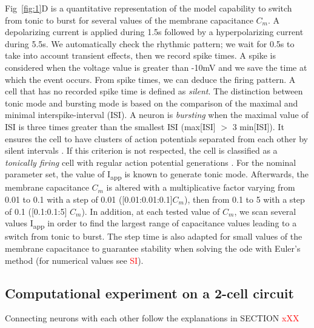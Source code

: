 Fig~\ref{fig:1}D is a quantitative representation of the model capability to switch from tonic to burst for several values of the membrane capacitance $C_m$.  A depolarizing current is applied during 1.5s followed by a hyperpolarizing current during 5.5s. We automatically check the rhythmic pattern; we wait for 0.5s to take into account transient effects, then we record spike times. A spike is considered when the voltage value is greater than -10mV and we save the time at which the event occurs.  From spike times, we can deduce the firing pattern. A cell that has no recorded spike time is defined as \textit{silent}. The distinction between tonic mode and bursting mode is based on the comparison of the maximal and minimal interspike-interval (ISI). A neuron is \textit{bursting} when the maximal value of ISI is three times greater than the smallest ISI (max[ISI] $>$ 3 min[ISI]). It ensures the cell to have clusters of action potentials separated from each other by  silent intervals . If this criterion is not respected, the cell is classified as a \textit{tonically firing }cell with regular action potential generations \citep{drion_switchable_2018, goldman_dependence_2000}. For the nominal parameter set, the value of I\textsubscript{app} is known to generate tonic mode. Afterwards, the membrane capacitance $C_m$ is altered with a multiplicative factor varying from 0.01 to 0.1 with a step of 0.01 ([0.01:0.01:0.1]$C_m$), then from 0.1 to 5 with a step of 0.1 ([0.1:0.1:5] $C_m$). In addition, at each tested value of $C_m$, we scan several values I\textsubscript{app} in order to find the largest range of capacitance values leading to a switch from tonic to burst. The step time is also adapted for small values of the membrane capacitance to guarantee stability when solving the ode with Euler’s method (for numerical values see \textcolor{red}{SI}).   


\subsection{Computational experiment on a 2-cell circuit}
Connecting neurons with each other follow the explanations in SECTION \textcolor{red}{xXX}

